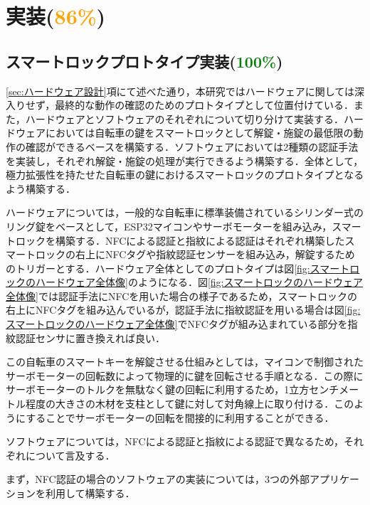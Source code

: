 \section{実装(\textcolor{orange}{86\%})}
  \label{sec:実装}
    \par
  
  \subsection{スマートロックプロトタイプ実装(\textcolor{green}{100\%})}
    \label{sec:スマートロックプロトタイプ実装}
      \par \ref{sec:ハードウェア設計}項にて述べた通り，本研究ではハードウェアに関しては深入りせず，最終的な動作の確認のためのプロトタイプとして位置付けている．また，ハードウェアとソフトウェアのそれぞれについて切り分けて実装する．ハードウェアにおいては自転車の鍵をスマートロックとして解錠・施錠の最低限の動作の確認ができるベースを構築する．ソフトウェアにおいては2種類の認証手法を実装し，それぞれ解錠・施錠の処理が実行できるよう構築する．全体として，極力拡張性を持たせた自転車の鍵におけるスマートロックのプロトタイプとなるよう構築する．
      \par ハードウェアについては，一般的な自転車に標準装備されているシリンダー式のリング錠をベースとして，ESP32マイコンやサーボモーターを組み込み，スマートロックを構築する．NFCによる認証と指紋による認証はそれぞれ構築したスマートロックの右上にNFCタグや指紋認証センサーを組み込み，解錠するためのトリガーとする．ハードウェア全体としてのプロトタイプは図\ref{fig:スマートロックのハードウェア全体像}のようになる．図\ref{fig:スマートロックのハードウェア全体像}では認証手法にNFCを用いた場合の様子であるため，スマートロックの右上にNFCタグを組み込んでいるが，認証手法に指紋認証を用いる場合は図\ref{fig:スマートロックのハードウェア全体像}でNFCタグが組み込まれている部分を指紋認証センサに置き換えれば良い．
      \par この自転車のスマートキーを解錠させる仕組みとしては，マイコンで制御されたサーボモーターの回転数によって物理的に鍵を回転させる手順となる．この際にサーボモーターのトルクを無駄なく鍵の回転に利用するため，1立方センチメートル程度の大きさの木材を支柱として鍵に対して対角線上に取り付ける．このようにすることでサーボモーターの回転を間接的に利用することができる．
      \par ソフトウェアについては，NFCによる認証と指紋による認証で異なるため，それぞれについて言及する．
      \par まず，NFC認証の場合のソフトウェアの実装については，3つの外部アプリケーションを利用して構築する．
